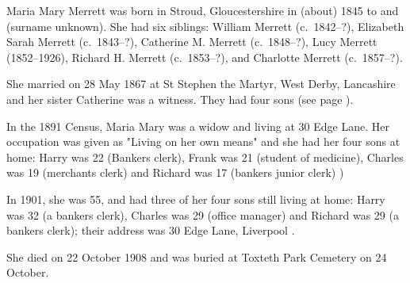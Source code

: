 
Maria Mary Merrett was born in Stroud, Gloucestershire in (about) 1845 to  and  (surname unknown).
She had  six siblings: William Merrett (c.~1842--?), Elizabeth Sarah Merrett (c.~1843--?), Catherine M. Merrett (c.~1848--?), Lucy Merrett (1852--1926), Richard H. Merrett (c.~1853--?), and Charlotte Merrett (c.~1857--?).

She married  on 28 May 1867 at St Stephen the Martyr, West Derby, Lancashire \cite{MariaMerrettMarriage} and her sister Catherine was a witness.
They had four sons (see page \pageref{Harry_Hancox}).

In the 1891 Census, Maria Mary was a widow and living at 30 Edge Lane. Her occupation was given as "Living on her own means" and she had her four sons at home: Harry was 22 (Bankers clerk), Frank was 21 (student of medicine), Charles was 19 (merchants clerk) and Richard was 17 (bankers junior clerk) \cite{MariaMerrettOccupation})

In 1901, she was 55, and had three of her four sons still living at home: Harry was 32 (a bankers clerk), Charles was 29 (office manager) and Richard was 29 (a bankers clerk); their address was 30 Edge Lane, Liverpool \cite{MariaMerrettResidence}.

She died on 22 October 1908 and was buried at Toxteth Park Cemetery on 24 October. \cite{MariaMerrettDeath}
